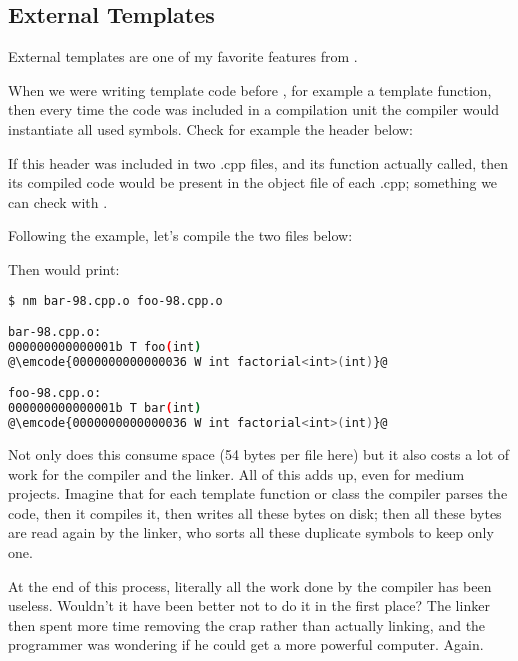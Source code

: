 \subsection{External Templates}

External templates are one of my favorite features from .

When we were writing template code before , for example a
template function, then every time the code was included in a
compilation unit the compiler would instantiate all used
symbols. Check for example the header below:



If this header was included in two .cpp files, and its function
actually called, then its compiled code would be present in the object
file of each .cpp; something we can check with .

Following the example, let's compile the two files below:





Then  would print:

\begin{lstlisting}[language=bash]
$ nm bar-98.cpp.o foo-98.cpp.o

bar-98.cpp.o:
000000000000001b T foo(int)
@\emcode{0000000000000036 W int factorial<int>(int)}@

foo-98.cpp.o:
000000000000001b T bar(int)
@\emcode{0000000000000036 W int factorial<int>(int)}@
\end{lstlisting}

Not only does this consume space (54 bytes per file here) but it also
costs a lot of work for the compiler and the linker. All of this adds
up, even for medium projects. Imagine that for each template function
or class the compiler parses the code, then it compiles it, then
writes all these bytes on disk; then all these bytes are read again by
the linker, who sorts all these duplicate symbols to keep only one.

At the end of this process, literally all the work done by the
compiler has been useless. Wouldn't it have been better not to do it
in the first place? The linker then spent more time removing the crap
rather than actually linking, and the programmer was wondering if he
could get a more powerful computer. Again.

